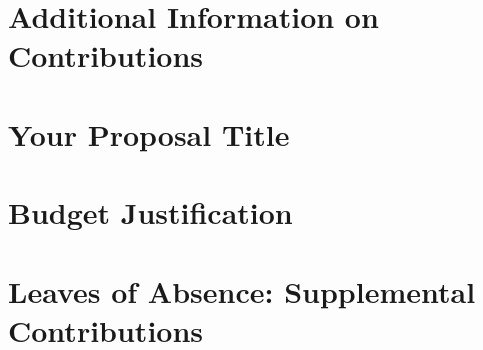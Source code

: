 \documentclass[12pt,english]{nserc-appendix}
\newcommand{\ccvcitation}[1]{[#1]}
\begin{document}
\section{Additional Information on Contributions}

\clearpage

\setcounter{page}{1}
\section{Your Proposal Title}

\clearpage

\setcounter{page}{1}
\section{Budget Justification}

%
\clearpage
%
\setcounter{page}{1}
\section{Leaves of Absence: Supplemental Contributions}

\clearpage
%
%
% 
\pagestyle{plain}
\setcounter{page}{1}
% 
\setlength{}

\end{document}
